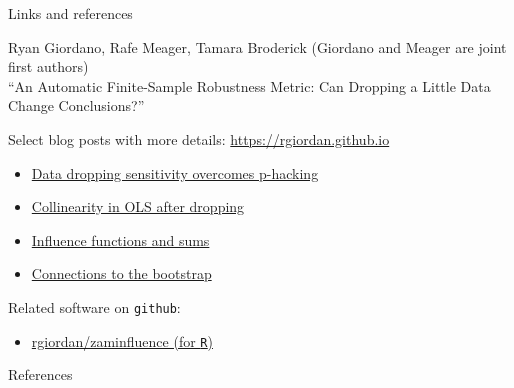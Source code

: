 \begin{frame}{Links and references}

\footnotesize

Ryan Giordano, Rafe Meager, Tamara Broderick
(Giordano and Meager are joint first authors) \\
``An Automatic Finite-Sample Robustness Metric: Can Dropping a Little Data Change Conclusions?''
\parencite{broderick:2025:automaticpart1,broderick:2025:automaticpart2}

\hrulefill

Select blog posts with more details: \hspace{1em}\url{https://rgiordan.github.io}
\begin{itemize}
\item \href{https://rgiordan.github.io/robustness/2021/09/17/amip_p_hacking.html}
    {Data dropping sensitivity overcomes p-hacking}
\item \href{https://rgiordan.github.io/amip/2021/12/17/reweighted_colinear_note.html}
    {Collinearity in OLS after dropping}
\item \href{https://rgiordan.github.io/amip/2021/12/01/influence_is_sum.html}
    {Influence functions and sums}
\item \href{https://rgiordan.github.io/amip/2021/11/08/bootstrap_influence.html}
    {Connections to the bootstrap}
\end{itemize}


\hrulefill

Related software on \texttt{github}:
\begin{itemize}
\item \href{https://github.com/rgiordan/zaminfluence}
{rgiordan/zaminfluence (for \texttt{R})}
\end{itemize}

\hrulefill

\end{frame}





\begin{frame}[allowframebreaks]{References}
\renewcommand*{\bibfont}{\normalfont\tiny}
\printbibliography[heading=none]
\end{frame}
